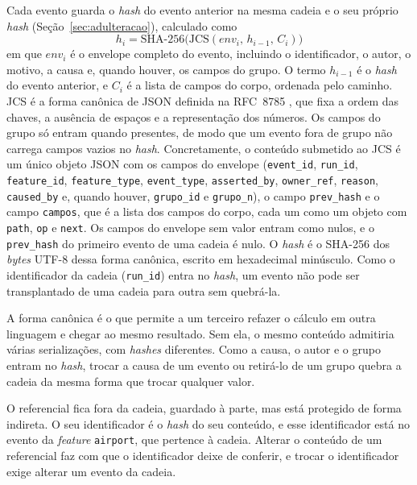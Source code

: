 Cada evento guarda o \textit{hash} do evento anterior na mesma cadeia e o seu próprio \textit{hash} (Seção~\ref{sec:adulteracao}), calculado como
\begin{equation}
    h_i = \mathrm{SHA\text{-}256}\big(\mathrm{JCS}(\mathit{env}_i,\, h_{i-1},\, C_i)\big)
    \label{eq:hash}
\end{equation}
em que $\mathit{env}_i$ é o envelope completo do evento, incluindo o identificador, o autor, o motivo, a causa e, quando houver, os campos do grupo. O termo $h_{i-1}$ é o \textit{hash} do evento anterior, e $C_i$ é a lista de campos do corpo, ordenada pelo caminho. JCS é a forma canônica de JSON definida na RFC~8785 \cite{rfc8785}, que fixa a ordem das chaves, a ausência de espaços e a representação dos números. Os campos do grupo só entram quando presentes, de modo que um evento fora de grupo não carrega campos vazios no \textit{hash}. Concretamente, o conteúdo submetido ao JCS é um único objeto JSON com os campos do envelope (\texttt{event\_id}, \texttt{run\_id}, \texttt{feature\_id}, \texttt{feature\_type}, \texttt{event\_type}, \texttt{asserted\_by}, \texttt{owner\_ref}, \texttt{reason}, \texttt{caused\_by} e, quando houver, \texttt{grupo\_id} e \texttt{grupo\_n}), o campo \texttt{prev\_hash} e o campo \texttt{campos}, que é a lista dos campos do corpo, cada um como um objeto com \texttt{path}, \texttt{op} e \texttt{next}. Os campos do envelope sem valor entram como nulos, e o \texttt{prev\_hash} do primeiro evento de uma cadeia é nulo. O \textit{hash} é o SHA-256 dos \textit{bytes} UTF-8 dessa forma canônica, escrito em hexadecimal minúsculo. Como o identificador da cadeia (\texttt{run\_id}) entra no \textit{hash}, um evento não pode ser transplantado de uma cadeia para outra sem quebrá-la.

A forma canônica é o que permite a um terceiro refazer o cálculo em outra linguagem e chegar ao mesmo resultado. Sem ela, o mesmo conteúdo admitiria várias serializações, com \textit{hashes} diferentes. Como a causa, o autor e o grupo entram no \textit{hash}, trocar a causa de um evento ou retirá-lo de um grupo quebra a cadeia da mesma forma que trocar qualquer valor.

O referencial fica fora da cadeia, guardado à parte, mas está protegido de forma indireta. O seu identificador é o \textit{hash} do seu conteúdo, e esse identificador está no evento da \textit{feature} \texttt{airport}, que pertence à cadeia. Alterar o conteúdo de um referencial faz com que o identificador deixe de conferir, e trocar o identificador exige alterar um evento da cadeia.

